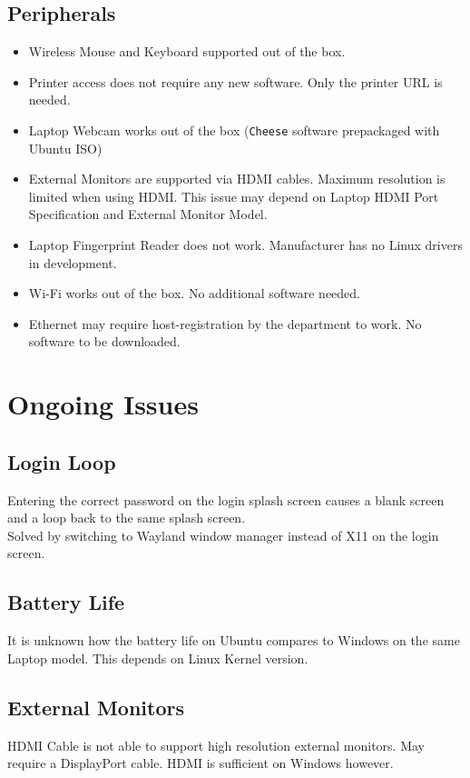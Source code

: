 \documentclass[12pt,letterpaper]{article}
\begin{document}
\subsection{Peripherals}

\begin{itemize}
	\item Wireless Mouse and Keyboard supported out of the box.
	\item Printer access does not require any new software. Only the printer URL is needed.
	\item Laptop Webcam works out of the box (\texttt{Cheese} software prepackaged with Ubuntu ISO)
	\item External Monitors are supported via HDMI cables. Maximum resolution is limited when using HDMI. This issue may depend on Laptop HDMI Port Specification and External Monitor Model.
	\item Laptop Fingerprint Reader does not work. Manufacturer has no Linux drivers in development.
	\item Wi-Fi works out of the box. No additional software needed.
	\item Ethernet may require host-registration by the department to work. No software to be downloaded.
\end{itemize}

\newpage

\section{Ongoing Issues}

\subsection{Login Loop}

Entering the correct password on the login splash screen causes a blank screen and a loop back to the same splash screen.\\

Solved by switching to Wayland window manager instead of X11 on the login screen.

\subsection{Battery Life}

It is unknown how the battery life on Ubuntu compares to Windows on the same Laptop model. This depends on Linux Kernel version.

\subsection{External Monitors}

HDMI Cable is not able to support high resolution external monitors. May require a DisplayPort cable. HDMI is sufficient on Windows however.
\end{document}
